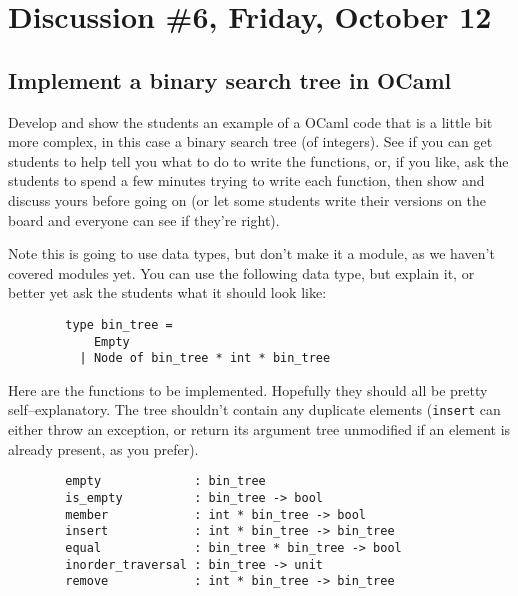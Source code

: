 \documentclass[12pt]{article}
\begin{document}

  \section{Discussion \#6, Friday, October 12}

    \subsection{Implement a binary search tree in OCaml}

      Develop and show the students an example of a OCaml code that is a
    little bit more complex, in this case a binary search tree (of
    integers).  See if you can get students to help tell you what to do to
    write the functions, or, if you like, ask the students to spend a few
    minutes trying to write each function, then show and discuss yours
    before going on (or let some students write their versions on the board
    and everyone can see if they're right).

      Note this is going to use data types, but don't make it a module, as we
    haven't covered modules yet.  You can use the following data type, but
    explain it, or better yet ask the students what it should look like:

      \medskip

      \begin{minipage}[t]{6in}

        \begin{Verbatim}
        type bin_tree =
            Empty
          | Node of bin_tree * int * bin_tree
        \end{Verbatim}

      \end{minipage}

      \bigskip

        Here are the functions to be implemented.  Hopefully they should all
      be pretty self--explanatory.  The tree shouldn't contain any duplicate
      elements (\texttt{insert} can either throw an exception, or return its
      argument tree unmodified if an element is already present, as you
      prefer).

      \medskip

      \begin{minipage}[t]{6in}

        \begin{Verbatim}
        empty             : bin_tree
        is_empty          : bin_tree -> bool
        member            : int * bin_tree -> bool
        insert            : int * bin_tree -> bin_tree
        equal             : bin_tree * bin_tree -> bool
        inorder_traversal : bin_tree -> unit
        remove            : int * bin_tree -> bin_tree
        \end{Verbatim}


      \end{minipage}
\end{document}
